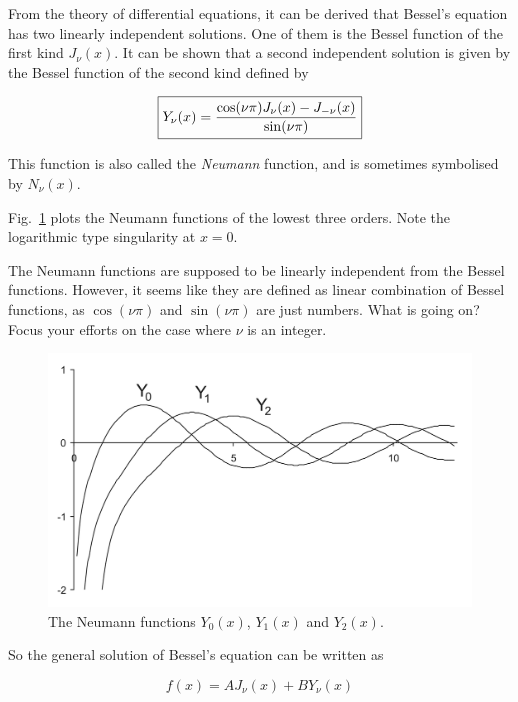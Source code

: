 From the theory of differential equations, it can be derived that Bessel's equation has two linearly independent solutions. One of them is the Bessel function of the first kind $J_\nu(x)$. It can be shown that a second independent solution is given by the Bessel function of the second kind defined by

\begin{equation}
\fbox{$\displaystyle
Y_\nu(x) = \frac{\cos(\nu \pi)J_\nu(x) - J_{-\nu}(x)}{\sin(\nu \pi)}
$}
\end{equation} 

This function is also called the \emph{Neumann} function, and is sometimes symbolised by $N_\nu(x)$.

Fig.~\ref{fig-bessel-Y} plots the Neumann functions of the lowest three orders. Note the logarithmic type singularity at $x=0$.

\begin{exer}
The Neumann functions are supposed to be linearly independent from the Bessel functions. However, it seems like they are defined as linear combination of Bessel functions, as $\cos(\nu \pi)$ and $\sin(\nu \pi)$ are just numbers. What is going on? Focus your efforts on the case where $\nu$ is an integer.
\end{exer}

\begin{figure}
\centering
\includegraphics{bessel/figures/y}
\caption{The Neumann functions $Y_0(x)$, $Y_1(x)$ and $Y_2(x)$.}
\label{fig-bessel-Y}
\end{figure}

So the general solution of Bessel's equation can be written as

\begin{equation}
f(x) = A J_{\nu}(x) + B Y_{\nu}(x)
\end{equation} 

